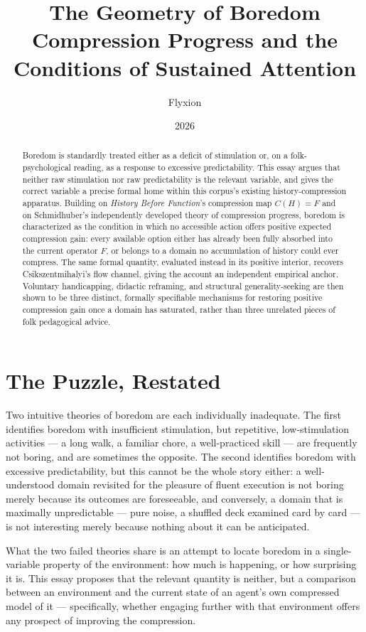 \documentclass[11pt]{article}
\title{\textbf{The Geometry of Boredom}\\[4pt]
\large Compression Progress and the Conditions of Sustained Attention}
\author{Flyxion}
\date{2026}
\begin{document}
\maketitle

\begin{abstract}
Boredom is standardly treated either as a deficit of stimulation or, on a folk-psychological reading, as a response to excessive predictability. This essay argues that neither raw stimulation nor raw predictability is the relevant variable, and gives the correct variable a precise formal home within this corpus's existing history-compression apparatus. Building on \emph{History Before Function}'s compression map $C(H)=F$ and on Schmidhuber's independently developed theory of compression progress, boredom is characterized as the condition in which no accessible action offers positive expected compression gain: every available option either has already been fully absorbed into the current operator $F$, or belongs to a domain no accumulation of history could ever compress. The same formal quantity, evaluated instead in its positive interior, recovers Csikszentmihalyi's flow channel, giving the account an independent empirical anchor. Voluntary handicapping, didactic reframing, and structural generality-seeking are then shown to be three distinct, formally specifiable mechanisms for restoring positive compression gain once a domain has saturated, rather than three unrelated pieces of folk pedagogical advice.
\end{abstract}

\section{The Puzzle, Restated}

Two intuitive theories of boredom are each individually inadequate. The first identifies boredom with insufficient stimulation, but repetitive, low-stimulation activities — a long walk, a familiar chore, a well-practiced skill — are frequently not boring, and are sometimes the opposite. The second identifies boredom with excessive predictability, but this cannot be the whole story either: a well-understood domain revisited for the pleasure of fluent execution is not boring merely because its outcomes are foreseeable, and conversely, a domain that is maximally unpredictable — pure noise, a shuffled deck examined card by card — is not interesting merely because nothing about it can be anticipated.

What the two failed theories share is an attempt to locate boredom in a single-variable property of the environment: how much is happening, or how surprising it is. This essay proposes that the relevant quantity is neither, but a comparison between an environment and the current state of an agent's own compressed model of it — specifically, whether engaging further with that environment offers any prospect of improving the compression.
\end{document}
